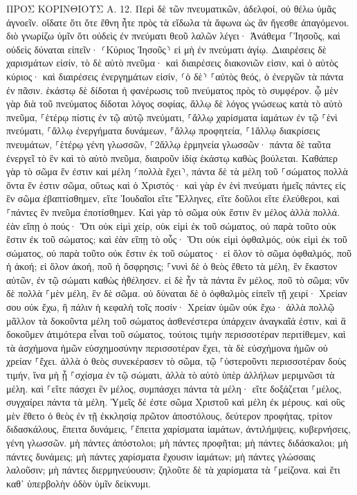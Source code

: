 \documentclass[twoside, 9pt]{extreport}
\begin{document}
ΠΡΟΣ ΚΟΡΙΝΘΙΟΥΣ Α.
12.
Περὶ δὲ τῶν πνευματικῶν, ἀδελφοί, οὐ θέλω ὑμᾶς ἀγνοεῖν. 
οἴδατε ὅτι ὅτε ἔθνη ἦτε πρὸς τὰ εἴδωλα τὰ ἄφωνα ὡς ἂν ἤγεσθε ἀπαγόμενοι. 
διὸ γνωρίζω ὑμῖν ὅτι οὐδεὶς ἐν πνεύματι θεοῦ λαλῶν λέγει· Ἀνάθεμα ⸀Ἰησοῦς, καὶ οὐδεὶς δύναται εἰπεῖν· ⸂Κύριος Ἰησοῦς⸃ εἰ μὴ ἐν πνεύματι ἁγίῳ. 
Διαιρέσεις δὲ χαρισμάτων εἰσίν, τὸ δὲ αὐτὸ πνεῦμα· 
καὶ διαιρέσεις διακονιῶν εἰσιν, καὶ ὁ αὐτὸς κύριος· 
καὶ διαιρέσεις ἐνεργημάτων εἰσίν, ⸂ὁ δὲ⸃ ⸀αὐτὸς θεός, ὁ ἐνεργῶν τὰ πάντα ἐν πᾶσιν. 
ἑκάστῳ δὲ δίδοται ἡ φανέρωσις τοῦ πνεύματος πρὸς τὸ συμφέρον. 
ᾧ μὲν γὰρ διὰ τοῦ πνεύματος δίδοται λόγος σοφίας, ἄλλῳ δὲ λόγος γνώσεως κατὰ τὸ αὐτὸ πνεῦμα, 
⸀ἑτέρῳ πίστις ἐν τῷ αὐτῷ πνεύματι, ⸀ἄλλῳ χαρίσματα ἰαμάτων ἐν τῷ ⸀ἑνὶ πνεύματι, 
⸀ἄλλῳ ἐνεργήματα δυνάμεων, ⸁ἄλλῳ προφητεία, ⸀1ἄλλῳ διακρίσεις πνευμάτων, ⸀ἑτέρῳ γένη γλωσσῶν, ⸀2ἄλλῳ ἑρμηνεία γλωσσῶν· 
πάντα δὲ ταῦτα ἐνεργεῖ τὸ ἓν καὶ τὸ αὐτὸ πνεῦμα, διαιροῦν ἰδίᾳ ἑκάστῳ καθὼς βούλεται. 
Καθάπερ γὰρ τὸ σῶμα ἕν ἐστιν καὶ μέλη ⸂πολλὰ ἔχει⸃, πάντα δὲ τὰ μέλη τοῦ ⸀σώματος πολλὰ ὄντα ἕν ἐστιν σῶμα, οὕτως καὶ ὁ Χριστός· 
καὶ γὰρ ἐν ἑνὶ πνεύματι ἡμεῖς πάντες εἰς ἓν σῶμα ἐβαπτίσθημεν, εἴτε Ἰουδαῖοι εἴτε Ἕλληνες, εἴτε δοῦλοι εἴτε ἐλεύθεροι, καὶ ⸀πάντες ἓν πνεῦμα ἐποτίσθημεν. 
Καὶ γὰρ τὸ σῶμα οὐκ ἔστιν ἓν μέλος ἀλλὰ πολλά. 
ἐὰν εἴπῃ ὁ πούς· Ὅτι οὐκ εἰμὶ χείρ, οὐκ εἰμὶ ἐκ τοῦ σώματος, οὐ παρὰ τοῦτο οὐκ ἔστιν ἐκ τοῦ σώματος; 
καὶ ἐὰν εἴπῃ τὸ οὖς· Ὅτι οὐκ εἰμὶ ὀφθαλμός, οὐκ εἰμὶ ἐκ τοῦ σώματος, οὐ παρὰ τοῦτο οὐκ ἔστιν ἐκ τοῦ σώματος· 
εἰ ὅλον τὸ σῶμα ὀφθαλμός, ποῦ ἡ ἀκοή; εἰ ὅλον ἀκοή, ποῦ ἡ ὄσφρησις; 
⸀νυνὶ δὲ ὁ θεὸς ἔθετο τὰ μέλη, ἓν ἕκαστον αὐτῶν, ἐν τῷ σώματι καθὼς ἠθέλησεν. 
εἰ δὲ ἦν τὰ πάντα ἓν μέλος, ποῦ τὸ σῶμα; 
νῦν δὲ πολλὰ ⸀μὲν μέλη, ἓν δὲ σῶμα. 
οὐ δύναται δὲ ὁ ὀφθαλμὸς εἰπεῖν τῇ χειρί· Χρείαν σου οὐκ ἔχω, ἢ πάλιν ἡ κεφαλὴ τοῖς ποσίν· Χρείαν ὑμῶν οὐκ ἔχω· 
ἀλλὰ πολλῷ μᾶλλον τὰ δοκοῦντα μέλη τοῦ σώματος ἀσθενέστερα ὑπάρχειν ἀναγκαῖά ἐστιν, 
καὶ ἃ δοκοῦμεν ἀτιμότερα εἶναι τοῦ σώματος, τούτοις τιμὴν περισσοτέραν περιτίθεμεν, καὶ τὰ ἀσχήμονα ἡμῶν εὐσχημοσύνην περισσοτέραν ἔχει, 
τὰ δὲ εὐσχήμονα ἡμῶν οὐ χρείαν ⸀ἔχει. ἀλλὰ ὁ θεὸς συνεκέρασεν τὸ σῶμα, τῷ ⸀ὑστεροῦντι περισσοτέραν δοὺς τιμήν, 
ἵνα μὴ ᾖ ⸀σχίσμα ἐν τῷ σώματι, ἀλλὰ τὸ αὐτὸ ὑπὲρ ἀλλήλων μεριμνῶσι τὰ μέλη. 
καὶ ⸀εἴτε πάσχει ἓν μέλος, συμπάσχει πάντα τὰ μέλη· εἴτε δοξάζεται ⸀μέλος, συγχαίρει πάντα τὰ μέλη. 
Ὑμεῖς δέ ἐστε σῶμα Χριστοῦ καὶ μέλη ἐκ μέρους. 
καὶ οὓς μὲν ἔθετο ὁ θεὸς ἐν τῇ ἐκκλησίᾳ πρῶτον ἀποστόλους, δεύτερον προφήτας, τρίτον διδασκάλους, ἔπειτα δυνάμεις, ⸀ἔπειτα χαρίσματα ἰαμάτων, ἀντιλήμψεις, κυβερνήσεις, γένη γλωσσῶν. 
μὴ πάντες ἀπόστολοι; μὴ πάντες προφῆται; μὴ πάντες διδάσκαλοι; μὴ πάντες δυνάμεις; 
μὴ πάντες χαρίσματα ἔχουσιν ἰαμάτων; μὴ πάντες γλώσσαις λαλοῦσιν; μὴ πάντες διερμηνεύουσιν; 
ζηλοῦτε δὲ τὰ χαρίσματα τὰ ⸀μείζονα. καὶ ἔτι καθ᾽ ὑπερβολὴν ὁδὸν ὑμῖν δείκνυμι. 
\end{document}
